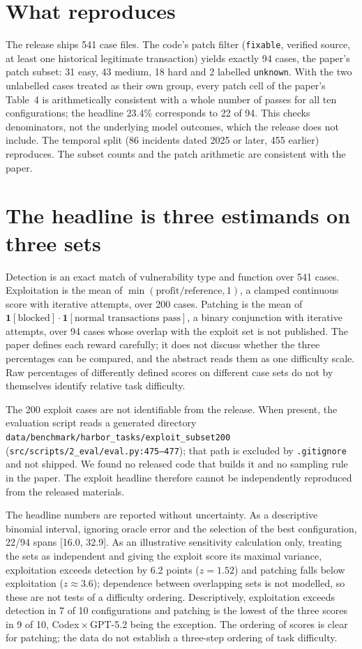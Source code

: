 \documentclass[11pt]{article}
\newcommand{\code}[1]{\texttt{\small #1}}
\begin{document}
\section{What reproduces}
The release ships 541 case files. The code's patch filter (\code{fixable}, verified source, at least one historical legitimate transaction) yields exactly 94 cases, the paper's patch subset: 31 easy, 43 medium, 18 hard and 2 labelled \code{unknown}. With the two unlabelled cases treated as their own group, every patch cell of the paper's Table~4 is arithmetically consistent with a whole number of passes for all ten configurations; the headline 23.4\% corresponds to 22 of 94. This checks denominators, not the underlying model outcomes, which the release does not include. The temporal split (86 incidents dated 2025 or later, 455 earlier) reproduces. The subset counts and the patch arithmetic are consistent with the paper.

\section{The headline is three estimands on three sets}
Detection is an exact match of vulnerability type and function over 541 cases. Exploitation is the mean of $\min(\text{profit}/\text{reference},1)$, a clamped continuous score with iterative attempts, over 200 cases. Patching is the mean of $\mathbf{1}[\text{blocked}]\cdot\mathbf{1}[\text{normal transactions pass}]$, a binary conjunction with iterative attempts, over 94 cases whose overlap with the exploit set is not published. The paper defines each reward carefully; it does not discuss whether the three percentages can be compared, and the abstract reads them as one difficulty scale. Raw percentages of differently defined scores on different case sets do not by themselves identify relative task difficulty.

The 200 exploit cases are not identifiable from the release. When present, the evaluation script reads a generated directory \code{data/benchmark/harbor\_tasks/exploit\_subset200} (\code{src/scripts/2\_eval/eval.py:475--477}); that path is excluded by \code{.gitignore} and not shipped. We found no released code that builds it and no sampling rule in the paper. The exploit headline therefore cannot be independently reproduced from the released materials.

The headline numbers are reported without uncertainty. As a descriptive binomial interval, ignoring oracle error and the selection of the best configuration, 22/94 spans [16.0, 32.9]. As an illustrative sensitivity calculation only, treating the sets as independent and giving the exploit score its maximal variance, exploitation exceeds detection by 6.2 points ($z=1.52$) and patching falls below exploitation ($z\approx3.6$); dependence between overlapping sets is not modelled, so these are not tests of a difficulty ordering. Descriptively, exploitation exceeds detection in 7 of 10 configurations and patching is the lowest of the three scores in 9 of 10, Codex\,$\times$\,GPT-5.2 being the exception. The ordering of scores is clear for patching; the data do not establish a three-step ordering of task difficulty.
\end{document}
